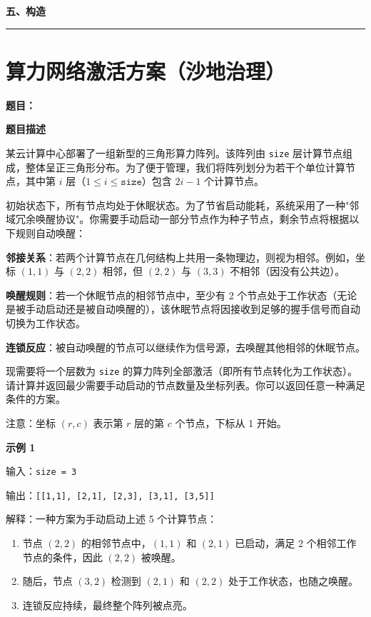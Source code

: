 \documentclass[12pt, a4paper]{article}
\newcommand{\category}[1]{%
  \vspace{1.2cm}
  {\noindent\Large\bfseries #1}
  \vspace{0.2em}\par
  \noindent\rule{\textwidth}{0.8pt}
  \vspace{0.2em}
}
\begin{document}
\category{五、构造}

\section{算力网络激活方案（沙地治理）}

\noindent\textbf{题目：}

\textbf{题目描述}

某云计算中心部署了一组新型的三角形算力阵列。该阵列由 \texttt{size} 层计算节点组成，整体呈正三角形分布。为了便于管理，我们将阵列划分为若干个单位计算节点，其中第 $i$ 层（$1 \leq i \leq \texttt{size}$）包含 $2i - 1$ 个计算节点。

初始状态下，所有节点均处于休眠状态。为了节省启动能耗，系统采用了一种"邻域冗余唤醒协议"。你需要手动启动一部分节点作为种子节点，剩余节点将根据以下规则自动唤醒：

\textbf{邻接关系}：若两个计算节点在几何结构上共用一条物理边，则视为相邻。例如，坐标 $(1,1)$ 与 $(2,2)$ 相邻，但 $(2,2)$ 与 $(3,3)$ 不相邻（因没有公共边）。

\textbf{唤醒规则}：若一个休眠节点的相邻节点中，至少有 2 个节点处于工作状态（无论是被手动启动还是被自动唤醒的），该休眠节点将因接收到足够的握手信号而自动切换为工作状态。

\textbf{连锁反应}：被自动唤醒的节点可以继续作为信号源，去唤醒其他相邻的休眠节点。

现需要将一个层数为 \texttt{size} 的算力阵列全部激活（即所有节点转化为工作状态）。请计算并返回最少需要手动启动的节点数量及坐标列表。你可以返回任意一种满足条件的方案。

注意：坐标 $(r, c)$ 表示第 $r$ 层的第 $c$ 个节点，下标从 1 开始。

\textbf{示例 1}

输入：\texttt{size = 3}

输出：\texttt{[[1,1], [2,1], [2,3], [3,1], [3,5]]}

解释：一种方案为手动启动上述 5 个计算节点：
\begin{enumerate}[leftmargin=2em]
  \item 节点 $(2, 2)$ 的相邻节点中，$(1,1)$ 和 $(2,1)$ 已启动，满足 2 个相邻工作节点的条件，因此 $(2,2)$ 被唤醒。
  \item 随后，节点 $(3,2)$ 检测到 $(2,1)$ 和 $(2,2)$ 处于工作状态，也随之唤醒。
  \item 连锁反应持续，最终整个阵列被点亮。
\end{enumerate}
\end{document}

